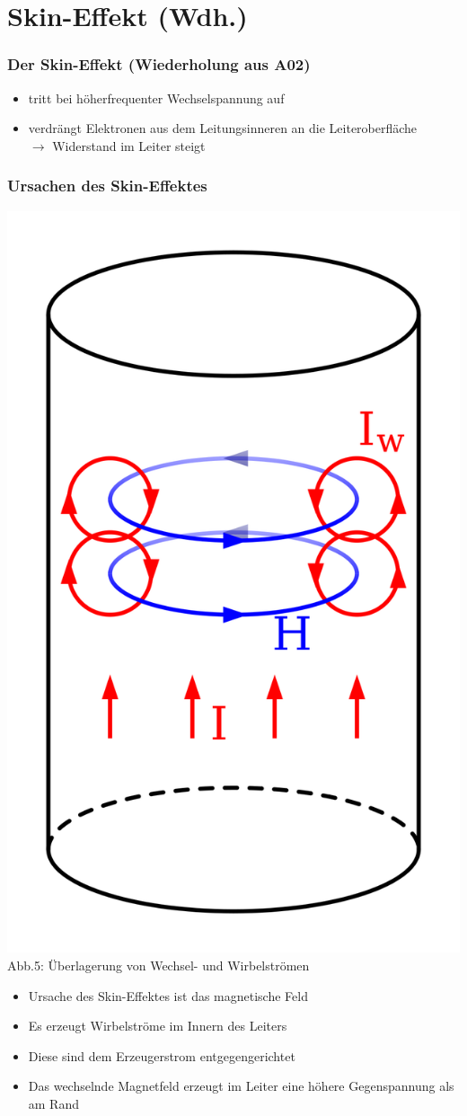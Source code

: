 \section*{Skin-Effekt (Wdh.)}
\begin{frame}
  \frametitle{Der Skin-Effekt (Wiederholung aus A02)}
  \begin{itemize}
    \item tritt bei höherfrequenter Wechselspannung auf
    \item verdrängt Elektronen aus dem Leitungsinneren an die Leiteroberfläche \\
      $\rightarrow$ Widerstand im Leiter steigt
  \end{itemize}
\end{frame}

\begin{frame}
  \frametitle{Ursachen des Skin-Effektes}
  \begin{center}
    \includegraphics[width=.4\textwidth,height=.35\textheight,keepaspectratio]{a02/Skineffect.png}\\
    {\tiny Abb.5: Überlagerung von Wechsel- und Wirbelströmen \cite{wp}}
    \begin{itemize}
      \item Ursache des Skin-Effektes ist das magnetische Feld
      \item Es erzeugt Wirbelströme im Innern des Leiters
      \item Diese sind dem Erzeugerstrom entgegengerichtet
      \item Das wechselnde Magnetfeld erzeugt im Leiter eine höhere Gegenspannung als am Rand
    \end{itemize}
  \end{center}
\end{frame}

